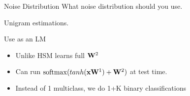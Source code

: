 \documentclass{beamer}
\begin{document}
\begin{frame}{Noise Distribution}
  What noise distribution should you use.

  Unigram estimations.
\end{frame}


\begin{frame}{Use as an LM}
  \begin{itemize}
  \item Unlike HSM learns full $\mathbf{W}^2$ 
    \air 

  \item Can run $\softmax(tanh(\boldx \boldW^1) + \boldW^2)$ at test time. 

  \item Instead of 1 multiclass, we do 1+K binary classifications


  \end{itemize}
\end{frame}






\end{document}
